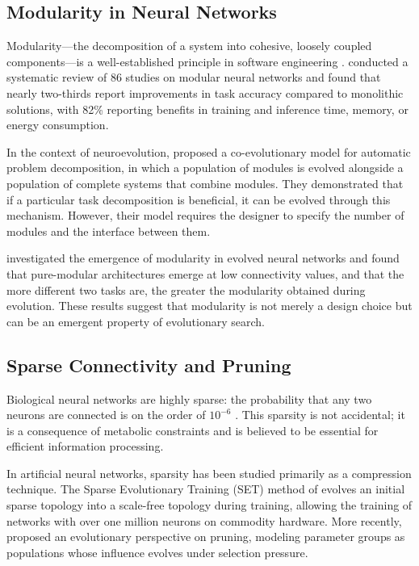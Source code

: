 \subsection{Modularity in Neural Networks}

Modularity—the decomposition of a system into cohesive, loosely coupled
components—is a well-established principle in software engineering
\citep{parnas1972modularity}. \citet{alho2024modularity} conducted a
systematic review of 86 studies on modular neural networks and found
that nearly two-thirds report improvements in task accuracy compared to
monolithic solutions, with 82\% reporting benefits in training and
inference time, memory, or energy consumption.

In the context of neuroevolution, \citet{khare2005coevolutionary}
proposed a co-evolutionary model for automatic problem decomposition, in
which a population of modules is evolved alongside a population of
complete systems that combine modules. They demonstrated that if a
particular task decomposition is beneficial, it can be evolved through
this mechanism. However, their model requires the designer to specify
the number of modules and the interface between them.

\citet{landassuri2012evolution} investigated the emergence of modularity
in evolved neural networks and found that pure-modular architectures
emerge at low connectivity values, and that the more different two tasks
are, the greater the modularity obtained during evolution. These results
suggest that modularity is not merely a design choice but can be an
emergent property of evolutionary search.

\subsection{Sparse Connectivity and Pruning}

Biological neural networks are highly sparse: the probability that any
two neurons are connected is on the order of $10^{-6}$ \citep{lecun2015deep}.
This sparsity is not accidental; it is a consequence of metabolic
constraints and is believed to be essential for efficient information
processing.

In artificial neural networks, sparsity has been studied primarily as a
compression technique. The Sparse Evolutionary Training (SET) method of
\citet{mocanu2018scalable} evolves an initial sparse topology into a
scale-free topology during training, allowing the training of networks
with over one million neurons on commodity hardware. More recently,
\citet{shah2026pruning} proposed an evolutionary perspective on pruning,
modeling parameter groups as populations whose influence evolves under
selection pressure.

